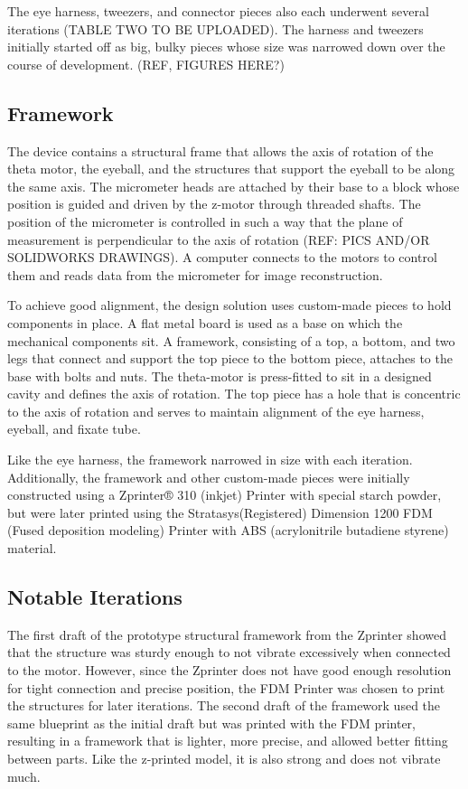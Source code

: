 \documentclass{article}
\begin{document}
The eye harness, tweezers, and connector pieces also each underwent several iterations (TABLE TWO TO BE UPLOADED). The harness and tweezers initially started off as big, bulky pieces whose size was narrowed down over the course of development. (REF, FIGURES HERE?)

\subsection{Framework}
\label{sec:frame}

The device contains a structural frame that allows the axis of rotation of the theta motor, the eyeball, and the structures that support the eyeball to be along the same axis. The micrometer heads are attached by their base to a block whose position is guided and driven by the z-motor through threaded shafts. The position of the micrometer is controlled in such a way that the plane of measurement is perpendicular to the axis of rotation (REF: PICS AND/OR SOLIDWORKS DRAWINGS). A computer connects to the motors to control them and reads data from the micrometer for image 
reconstruction. 

To achieve good alignment, the design solution uses custom-made pieces to hold components in place. A flat metal board is used as a base on which the mechanical components sit. A framework, consisting of a top, a bottom, and two legs that connect and support the top piece to the bottom piece, attaches to the base with bolts and nuts. The theta-motor is press-fitted to sit in a designed cavity and defines the axis of rotation. The top piece has a hole that is concentric to the axis of rotation and serves to maintain alignment of the eye harness, eyeball, and fixate tube. 

Like the eye harness, the framework narrowed in size with each iteration. Additionally, the framework and other custom-made pieces were initially constructed using a  Zprinter® 310 (inkjet) Printer with special starch powder, but were later printed using the Stratasys(Registered) Dimension 1200 FDM (Fused deposition modeling) Printer with ABS (acrylonitrile butadiene styrene) material. 

\subsection{Notable Iterations}

The first draft of the prototype structural framework from the Zprinter showed that the structure was sturdy enough to not vibrate excessively when connected to the motor. However, since the Zprinter does not have good enough resolution for tight connection and precise position, the FDM Printer was chosen to print the structures for later iterations. The second draft of the framework used the same blueprint as the initial draft but was printed with the FDM printer, resulting in a framework that is lighter, more precise, and allowed better fitting between parts. Like the z-printed model, it is also strong and does not vibrate much. 
\end{document}
